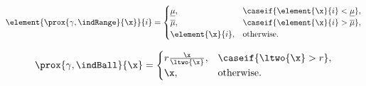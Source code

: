 \begin{equation}
    \element{\prox{\gamma, \indRange}{\x}}{i} = 
    \begin{cases}
        \underline{\mu}, & \caseif{\element{\x}{i} < \underline{\mu}}, \\
        \overline{\mu}, & \caseif{\element{\x}{i} > \overline{\mu}}, \\
        \element{\x}{i}, & \text{otherwise}.
    \end{cases}
\end{equation}

\begin{equation}
    \prox{\gamma, \indBall}{\x} = 
    \begin{cases}
        r \frac{\x}{\ltwo{\x}}, & \caseif{\ltwo{\x} > r}, \\
        \x, & \text{otherwise}.
    \end{cases}
\end{equation}